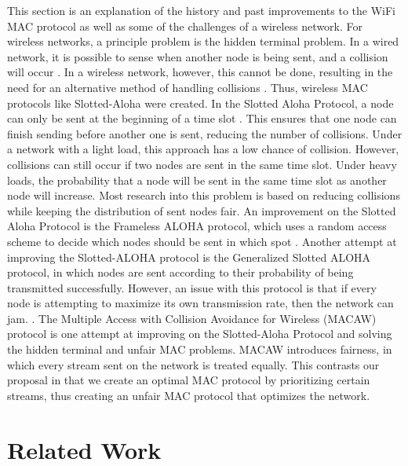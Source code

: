 \documentclass{sigcomm-alternate}
\begin{document}
This section is an explanation of the history and past improvements to the WiFi MAC protocol as well as some of the challenges of a wireless network. For wireless networks, a principle problem is the hidden terminal problem. In a wired network, it is possible to sense when another node is being sent, and a collision will occur \cite{869217}. In a wireless network, however, this cannot be done, resulting in the need for an alternative method of handling collisions \cite{6574961}. Thus, wireless MAC protocols like Slotted-Aloha were created.  In the Slotted Aloha Protocol, a node can only be sent at the beginning of a time slot \cite{5340799}. This ensures that one node can finish sending before another one is sent, reducing the number of collisions.  Under a network with a light load, this approach has a low chance of collision. However, collisions can still occur if two nodes are sent in the same time slot. Under heavy loads, the probability that a node will be sent in the same time slot as another node will increase. Most research into this problem is based on reducing collisions while keeping the distribution of sent nodes fair.  An improvement on the Slotted Aloha Protocol is the Frameless ALOHA protocol, which uses a random access scheme to decide which nodes should be sent in which spot \cite{6336861}. Another attempt at improving the Slotted-ALOHA protocol is the Generalized Slotted ALOHA protocol, in which nodes are sent according to their probability of being transmitted successfully. However, an issue with this protocol is that if every node is attempting to maximize its own transmission rate, then the network can jam. \cite{4548143 }.  The Multiple Access with Collision Avoidance for Wireless (MACAW) protocol is one attempt at improving on the Slotted-Aloha Protocol and solving the hidden terminal and unfair MAC problems. MACAW introduces fairness, in which every stream sent on the network is treated equally. This contrasts our proposal in that we create an optimal MAC protocol by prioritizing certain streams, thus creating an unfair MAC protocol that optimizes the network.

\section{Related Work}
\label{section:relatedwork}
\end{document}
